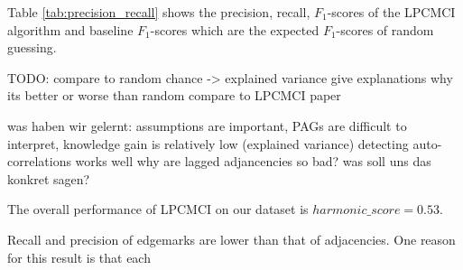 \documentclass[conference]{IEEEtran}
\begin{document}
\begin{table}[!htb]
\begin{center}
    \end{center}
\end{table}
Table \ref{tab:precision_recall} shows the precision, recall, $F_1$-scores of the LPCMCI algorithm and baseline $F_1$-scores which are the expected $F_1$-scores of random guessing. 




TODO:
compare to random chance -> explained variance
give explanations  why its better or worse than random
compare to LPCMCI paper

was haben wir gelernt: 
    assumptions are important, 
    PAGs are difficult to interpret, 
    knowledge gain is relatively low (explained variance)
    detecting auto-correlations works well
    why are lagged adjancencies so bad?
was soll uns das konkret sagen?






The overall performance of LPCMCI on our dataset is $harmonic\_score = 0.53$.


Recall and precision of edgemarks are lower than that of adjacencies. One reason for this result is that each 
\end{document}
